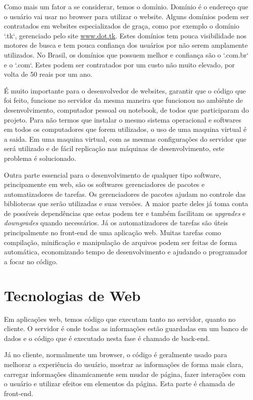 Como mais um fator a se considerar, temos o domínio. Domínio é o endereço que o usuário vai usar no browser para utilizar o website. Alguns domínios podem ser contratados em websites especializados de graça, como por exemplo o domínio `.tk`, gerenciado pelo site \url{www.dot.tk}. Estes domínios tem pouca visibilidade nos motores de busca e tem pouca confiança dos usuários por não serem amplamente utilizados. No Brasil, os domínios que possuem melhor e confiança são o `.com.br` e o `.com`. Estes podem ser contratados por um custo não muito elevado, por volta de 50 reais por um ano.

É muito importante para o desenvolvedor de websites, garantir que o código que foi feito, funcione no servidor da mesma maneira que funcionou no ambiênte de desenvolvimento, computador pessoal ou notebook, de todos que participaram do projeto. Para não termos que instalar o mesmo sistema operacional e softwares em todos os computadores que forem utilizados, o uso de uma maquina virtual é a saida. Em uma maquina virtual, com as mesmas configurações do servidor que será utilizado e de fácil replicação nas máquinas de desenvolvimento, este problema é solucionado.

Outra parte essencial para o desenvolvimento de qualquer tipo software, principamente em web, são os softwares gerenciadores de pacotes e automatizadores de tarefas. Os gerenciadores de pacotes ajudam no controle das bibliotecas que serão utilizadas e suas versões. A maior parte deles já toma conta de possíveis dependências que estas podem ter e também facilitam os \textit{upgrades} e \textit{downgrades} quando necessários. Já os automatizadores de tarefas são úteis principalmente no front-end de uma aplicação web. Muitas tarefas como compilação, minificação e manipulação de arquivos podem ser feitas de forma automática, economizando tempo de desenvolvimento e ajudando o programador a focar no código.

\section{Tecnologias de Web}

Em aplicações web, temos código que executam tanto no servidor, quanto no cliente. O servidor é onde todas as informações estão guardadas em um banco de dados e o código que é executado nesta fase é chamado de back-end. 

Já no cliente, normalmente um browser, o código é geralmente usado para melhorar a experiência do usuário, mostrar as informações de forma mais clara, carregar informações dinamicamente sem mudar de página, fazer interações com o usuário e utilizar efeitos em elementos da página. Esta parte é chamada de front-end.


